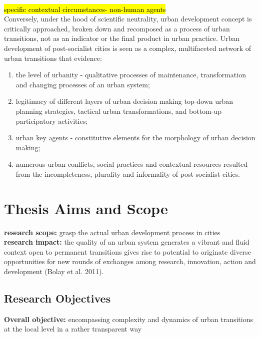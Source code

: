 \documentclass[11pt]{report}
\begin{document}
\\
\hl{specific contextual circumstances- non-human agents}
\\
Conversely, under the hood of scientific neutrality, urban development concept is critically approached, broken down and recomposed as a process of urban transitions, not as an indicator or the final product in urban practice. Urban development of post-socialist cities is seen as a complex, multifaceted network of urban transitions that evidence: 
\begin{enumerate}
\item the level of urbanity - qualitative processes of maintenance, transformation and changing processes of an urban system;
\item legitimacy of different layers of urban decision making top-down urban planning strategies, tactical urban transformations, and bottom-up participatory activities;
\item urban key agents - constitutive elements for the morphology of urban decision making;
\item numerous urban conflicts, social practices and contextual resources resulted from the incompleteness, plurality and informality of post-socialist cities.
\end{enumerate}  

\section{Thesis Aims and Scope}
\textbf{research scope:} grasp the actual urban development process in cities
\\
\textbf{research impact:} the quality of an urban system generates a vibrant and fluid context open to permanent transitions gives rise to potential to originate diverse opportunities for new rounds of exchanges among research, innovation, action and development (Bolay et al. 2011).

\subsection{Research Objectives}
\textbf{Overall objective:} encompassing complexity and dynamics of urban transitions at the local level in a rather transparent way
\\
\end{document}
